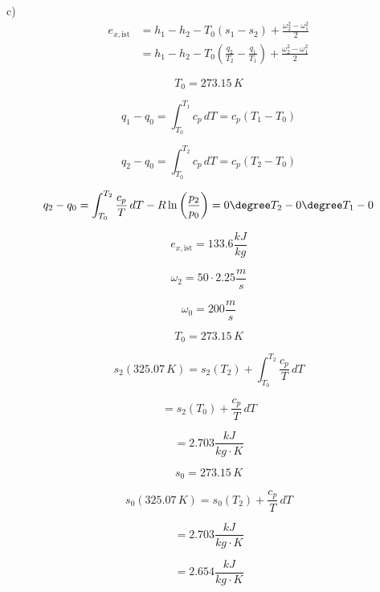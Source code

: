 c)
\begin{align*}
e_{x, \text{ist}} &= h_1 - h_2 - T_0 (s_1 - s_2) + \frac{\omega_2^2 - \omega_1^2}{2} \\
&= h_1 - h_2 - T_0 \left( \frac{q_2}{T_2} - \frac{q_1}{T_1} \right) + \frac{\omega_2^2 - \omega_1^2}{2}
\end{align*}

\[
T_0 = 273.15 \, K
\]

\[
q_1 - q_0 = \int_{T_0}^{T_1} c_p \, dT = c_p (T_1 - T_0)
\]

\[
q_2 - q_0 = \int_{T_0}^{T_2} c_p \, dT = c_p (T_2 - T_0)
\]

\[
q_2 - q_0 = \int_{T_0}^{T_2} \frac{c_p}{T} \, dT - R \ln \left( \frac{p_2}{p_0} \right) = 0 \degree T_2 - 0 \degree T_1 - 0
\]

\[
e_{x, \text{ist}} = 133.6 \frac{kJ}{kg}
\]

\[
\omega_2 = 50 \cdot 2.25 \frac{m}{s}
\]

\[
\omega_0 = 200 \frac{m}{s}
\]

\[
T_0 = 273.15 \, K
\]

\[
s_2 (325.07 \, K) = s_2 (T_2) + \int_{T_0}^{T_2} \frac{c_p}{T} \, dT
\]

\[
= s_2 (T_0) + \frac{c_p}{T} \, dT
\]

\[
= 2.703 \frac{kJ}{kg \cdot K}
\]

\[
s_0 = 273.15 \, K
\]

\[
s_0 (325.07 \, K) = s_0 (T_2) + \frac{c_p}{T} \, dT
\]

\[
= 2.703 \frac{kJ}{kg \cdot K}
\]

\[
= 2.654 \frac{kJ}{kg \cdot K}
\]